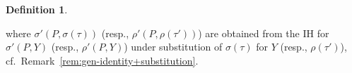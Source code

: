 \documentclass[10pt,a4paper]{amsart}
\theoremstyle{plain}
\theoremstyle{definition}
\newtheorem{definition}[definition]{Definition}
\renewcommand{\todo}[1]{}
\theoremstyle{plain}
\theoremstyle{definition} %
\newcommand{\seqar}{\Rightarrow}
\newcommand{\lr}[1]{#1_l}
\newcommand{\rr}[1]{#1_r}
\newcommand{\LJ}{\mathsf{LJ}}
\begin{document}
\begin{definition}
\begin{itemize}
\[{{{        }
        }
        }
        \]
        where $\sigma'(P,\sigma(\tau))$ (resp., $\rho'(P,\rho(\tau'))$) are obtained from the IH for $\sigma'(P,Y)$ (resp., $\rho'(P,Y)$) under substitution of $\sigma(\tau)$ for $Y$ (resp., $\rho(\tau')$), cf.~Remark~\ref{rem:gen-identity+substitution}.
        \end{itemize}
\end{definition}
\end{document}
